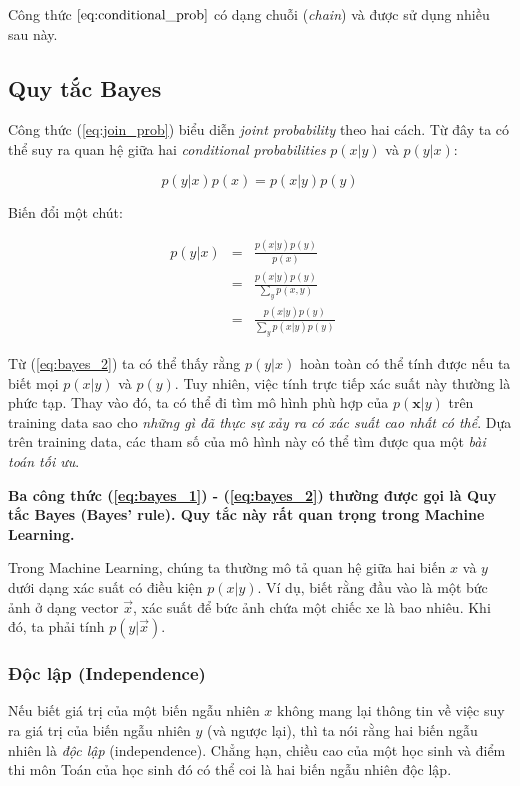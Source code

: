 \documentclass[../main-report.tex]{subfiles}
\begin{document}
Công thức \(\ref{eq:conditional_prob}\) có dạng chuỗi (\textit{chain}) và được sử dụng nhiều sau này.

\subsection{Quy tắc Bayes}
Công thức (\ref{eq:join_prob}) biểu diễn \textit{joint probability} theo hai cách. Từ đây ta có thể suy ra quan hệ giữa hai \textit{conditional probabilities} \(p(x |y)\) và \(p(y | x)\):

\[
  p(y | x) p(x) = p(x | y) p(y)
\]

Biến đổi một chút:

\begin{eqnarray}
  p(y | x)
  & = & \frac{p(x | y) p(y)}{p(x)} \label{eq:bayes_1} \\
  & = & \frac{p(x | y) p(y)}{\sum_{y} p(x, y)} \\
  & = & \frac{p(x |y) p(y)}{\sum_{y} p(x | y) p(y)} \quad \label{eq:bayes_2}
\end{eqnarray}

Từ (\ref{eq:bayes_2}) ta có thể thấy rằng \(p(y | x)\) hoàn toàn có thể tính được nếu ta biết mọi \(p(x | y)\) và \(p(y)\). Tuy nhiên, việc tính trực tiếp xác suất này thường là phức tạp. Thay vào đó, ta có thể đi tìm mô hình phù hợp của \(p(\mathbf{x} | y)\) trên training data sao cho \textit{những gì đã thực sự xảy ra có xác suất cao nhất có thể}. Dựa trên training data, các tham số của mô hình này có thể tìm được qua một \textit{bài toán tối ưu}.

\textbf{Ba công thức (\ref{eq:bayes_1}) - (\ref{eq:bayes_2}) thường được gọi là Quy tắc Bayes (Bayes' rule). Quy tắc này rất quan trọng trong Machine Learning.}

Trong Machine Learning, chúng ta thường mô tả quan hệ giữa hai biến \(x\) và \(y\) dưới dạng xác suất có điều kiện \(p(x|y)\). Ví dụ, biết rằng đầu vào là một bức ảnh ở dạng vector \(\vec{x}\), xác suất để bức ảnh chứa một chiếc xe là bao nhiêu. Khi đó, ta phải tính \(p(y | \vec{x})\).

\subsubsection*{Độc lập (Independence)}
Nếu biết giá trị của một biến ngẫu nhiên \(x\) không mang lại thông tin về việc suy ra giá trị của biến ngẫu nhiên \(y\) (và ngược lại), thì ta nói rằng hai biến ngẫu nhiên là \emph{độc lập} (independence). Chẳng hạn, chiều cao của một học sinh và điểm thi môn Toán của học sinh đó có thể coi là hai biến ngẫu nhiên độc lập.
\end{document}
